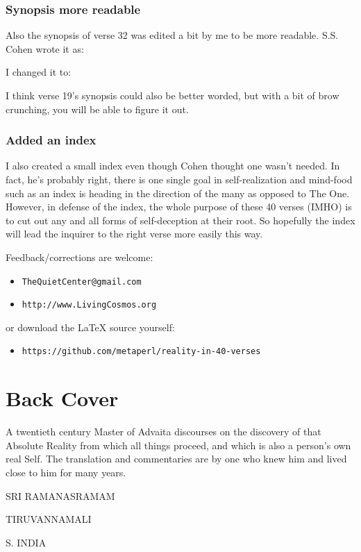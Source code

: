 \documentclass[12pt]{report}
\begin{document}
\subsection{Synopsis more readable}
Also the synopsis of verse 32 was edited a bit by me to be more
readable. S.S. Cohen wrote it as: 


I changed it to:


I think verse 19's synopsis could also be better worded, but with a
bit of brow crunching, you will be able to figure it out.

\subsection{Added an index}

I also created a small index even though Cohen thought one wasn't
needed. In fact, he's probably right, there is one single goal in
self-realization and mind-food such as an index is heading in the
direction of the many as opposed to The One. However, in defense of
the index, the whole purpose of these 40 verses (IMHO) is to cut out
any and all forms of self-deception at their root. So hopefully the
index will lead the inquirer to the right verse more easily this way.


Feedback/corrections are welcome: 
\begin{itemize}
\item \verb+TheQuietCenter@gmail.com+
\item \verb+http://www.LivingCosmos.org+
\end{itemize}

or download the LaTeX source yourself:
\begin{itemize}
\item \verb+https://github.com/metaperl/reality-in-40-verses+
\end{itemize}


\chapter{Back Cover}

A twentieth century Master of Advaita discourses on the discovery of
that Absolute Reality from which all things proceed, and which is
also a person's own real Self. The translation and commentaries are by
one who knew him and lived close to him for many years.

SRI RAMANASRAMAM

TIRUVANNAMALI

S. INDIA
\end{document}
